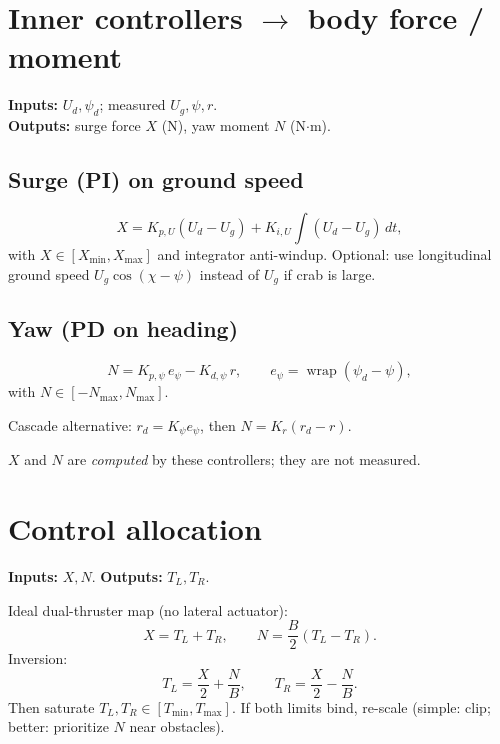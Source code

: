 \documentclass[11pt,a4paper]{article}
\begin{document}
\section{Inner controllers $\rightarrow$ body force / moment}

\textbf{Inputs:} \(U_d,\psi_d\); measured \(U_g,\psi,r\).\\
\textbf{Outputs:} surge force \(X\) (N), yaw moment \(N\) (N$\cdot$m).

\subsection{Surge (PI) on ground speed}
\[
X = K_{p,U}(U_d-U_g) + K_{i,U}\int(U_d-U_g)\,dt,
\]
with \(X\in[X_{\min},X_{\max}]\) and integrator anti-windup.
Optional: use longitudinal ground speed
\(U_g\cos(\chi-\psi)\) instead of \(U_g\) if crab is large.

\subsection{Yaw (PD on heading)}
\[
N = K_{p,\psi}\,e_\psi - K_{d,\psi}\, r,\qquad
e_\psi=\operatorname{wrap}(\psi_d-\psi),
\]
with \(N\in[-N_{\max},N_{\max}]\).

Cascade alternative: \(r_d=K_\psi e_\psi\), then \(N=K_r(r_d-r)\).

\(X\) and \(N\) are \emph{computed} by these controllers; they are not measured.

\section{Control allocation}

\textbf{Inputs:} \(X,N\).
\textbf{Outputs:} \(T_L,T_R\).

Ideal dual-thruster map (no lateral actuator):
\[
X=T_L+T_R,\qquad
N=\frac{B}{2}(T_L-T_R).
\]
Inversion:
\begin{equation}
\boxed{
T_L=\frac{X}{2}+\frac{N}{B},\qquad
T_R=\frac{X}{2}-\frac{N}{B}.
}
\end{equation}
Then saturate \(T_L,T_R\in[T_{\min},T_{\max}]\).
If both limits bind, re-scale (simple: clip; better: prioritize \(N\) near obstacles).
\end{document}
